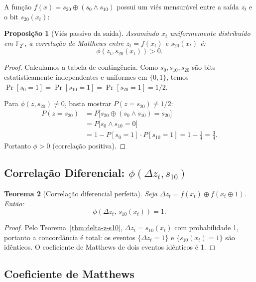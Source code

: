 \documentclass[12pt,a4paper]{article}
\newtheorem{theorem}{Teorema}[section]
\newtheorem{proposition}[theorem]{Proposição}
\theoremstyle{definition}
\theoremstyle{remark}
\newcommand{\GF}[1]{\mathbb{F}_{2^{#1}}}
\newcommand{\xor}{\oplus}
\newcommand{\AND}{\wedge}
\newcommand{\filter}{f}
\newcommand{\ks}{z}
\begin{document}
A função $\filter(x) = s_{20} \xor (s_0 \AND s_{10})$ possui um viés
mensurável entre a saída $\ks_t$ e o bit $s_{20}(x_t)$:

\begin{proposition}[Viés passivo da saída]
  \label{prop:passive-bias}
  Assumindo $x_t$ uniformemente distribuído em $\GF{e}$, a correlação
  de Matthews entre $\ks_t = \filter(x_t)$ e $s_{20}(x_t)$ é:
  \[
    \phi(\ks_t, s_{20}(x_t)) > 0.
  \]
\end{proposition}

\begin{proof}
  Calculamos a tabela de contingência. Como $s_0, s_{10}, s_{20}$ são bits
  estatisticamente independentes e uniformes em $\{0,1\}$, temos
  $\Pr[s_0=1]=\Pr[s_{10}=1]=\Pr[s_{20}=1]=1/2$.

  Para $\phi(\ks, s_{20}) \neq 0$, basta mostrar $P(\ks=s_{20}) \neq 1/2$:
  \begin{align*}
    P(\ks = s_{20}) &= P\bigl[s_{20} \xor (s_0 \AND s_{10}) = s_{20}\bigr] \\
                    &= P\bigl[s_0 \AND s_{10} = 0\bigr] \\
                    &= 1 - P[s_0=1] \cdot P[s_{10}=1] = 1 - \tfrac{1}{4} = \tfrac{3}{4}.
  \end{align*}
  Portanto $\phi > 0$ (correlação positiva). \qedhere
\end{proof}

\subsection{Correlação Diferencial: $\phi(\Delta\ks_t, s_{10})$}

\begin{theorem}[Correlação diferencial perfeita]
  \label{thm:diff-corr}
  Seja $\Delta\ks_t = \filter(x_t) \xor \filter(x_t \xor 1)$. Então:
  \[
    \phi(\Delta\ks_t,\, s_{10}(x_t)) = 1.
  \]
\end{theorem}

\begin{proof}
  Pelo Teorema~\ref{thm:delta-z-s10}, $\Delta\ks_t = s_{10}(x_t)$ com
  probabilidade 1, portanto a concordância é total: os eventos
  $\{\Delta\ks_t = 1\}$ e $\{s_{10}(x_t) = 1\}$ são idênticos.
  O coeficiente de Matthews de dois eventos idênticos é 1. \qedhere
\end{proof}

\subsection{Coeficiente de Matthews}
\end{document}
